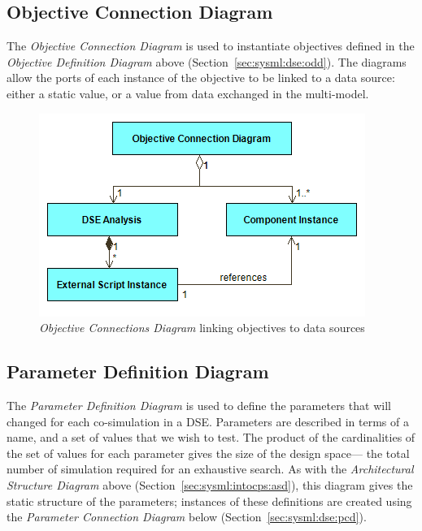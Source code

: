 \subsection{Objective Connection Diagram}
\label{sec:sysml:dse:ocd}

The \emph{Objective Connection Diagram} is used to instantiate objectives defined in the \emph{Objective Definition Diagram} above (Section~\ref{sec:sysml:dse:odd}). The diagrams allow the ports of each instance of the objective to be linked to a data source: either a static value, or a value from data exchanged in the multi-model.

\begin{figure}[h!]
\centering
\includegraphics[scale=0.5]{figures/DSE/ObjectiveConnectionsView}
\caption{\emph{Objective Connections Diagram} linking objectives to data sources}
\label{fig:sysml:sysml:dse:ocd}
\end{figure}

\subsection{Parameter Definition Diagram}
\label{sec:sysml:dse:pdd}

The \emph{Parameter Definition Diagram} is used to define the parameters that will changed for each co-simulation in a DSE. Parameters are described in terms of a name, and a set of values that we wish to test. The product of the cardinalities of the set of values for each parameter gives the size of the design space--- the total number of simulation required for an exhaustive search. As with the \emph{Architectural Structure Diagram} above (Section~\ref{sec:sysml:intocps:asd}), this diagram gives the static structure of the parameters; instances of these definitions are created using the \emph{Parameter Connection Diagram} below (Section~\ref{sec:sysml:dse:pcd}).

